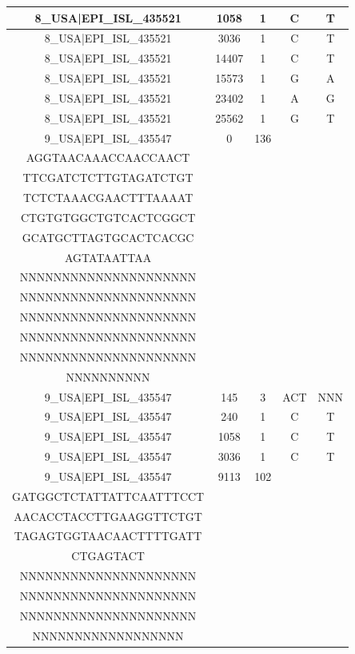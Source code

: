 \documentclass[a4paper,10pt]{article}
\begin{document}
\begin{longtable}{@{}ccccc@{}}
8\_USA|EPI\_ISL\_435521 & 1058 & 1 & C & T \\* \midrule
8\_USA|EPI\_ISL\_435521 & 3036 & 1 & C & T \\* \midrule
8\_USA|EPI\_ISL\_435521 & 14407 & 1 & C & T \\* \midrule
8\_USA|EPI\_ISL\_435521 & 15573 & 1 & G & A \\* \midrule
8\_USA|EPI\_ISL\_435521 & 23402 & 1 & A & G \\* \midrule
8\_USA|EPI\_ISL\_435521 & 25562 & 1 & G & T \\* \midrule
9\_USA|EPI\_ISL\_435547 & 0 & 136 & \begin{tabular}[c]{@{}c@{}}ATTAAAGGTTTATACCTTCCC\\ AGGTAACAAACCAACCAACT\\ TTCGATCTCTTGTAGATCTGT\\ TCTCTAAACGAACTTTAAAAT\\ CTGTGTGGCTGTCACTCGGCT\\ GCATGCTTAGTGCACTCACGC\\ AGTATAATTAA\end{tabular} & \begin{tabular}[c]{@{}c@{}}NNNNNNNNNNNNNNNNNNNNN\\ NNNNNNNNNNNNNNNNNNNNN\\ NNNNNNNNNNNNNNNNNNNNN\\ NNNNNNNNNNNNNNNNNNNNN\\ NNNNNNNNNNNNNNNNNNNNN\\ NNNNNNNNNNNNNNNNNNNNN\\ NNNNNNNNNN\end{tabular} \\* \midrule
9\_USA|EPI\_ISL\_435547 & 145 & 3 & ACT & NNN \\* \midrule
9\_USA|EPI\_ISL\_435547 & 240 & 1 & C & T \\* \midrule
9\_USA|EPI\_ISL\_435547 & 1058 & 1 & C & T \\* \midrule
9\_USA|EPI\_ISL\_435547 & 3036 & 1 & C & T \\* \midrule
9\_USA|EPI\_ISL\_435547 & 9113 & 102 & \begin{tabular}[c]{@{}c@{}}CTGACACACGTTATGTGCTCATG\\ GATGGCTCTATTATTCAATTTCCT\\ AACACCTACCTTGAAGGTTCTGT\\ TAGAGTGGTAACAACTTTTGATT\\ CTGAGTACT\end{tabular} & \begin{tabular}[c]{@{}c@{}}NNNNNNNNNNNNNNNNNNNNN\\ NNNNNNNNNNNNNNNNNNNNN\\ NNNNNNNNNNNNNNNNNNNNN\\ NNNNNNNNNNNNNNNNNNNNN\\ NNNNNNNNNNNNNNNNNN\end{tabular} \\* \midrule

\end{longtable}
\end{document}
